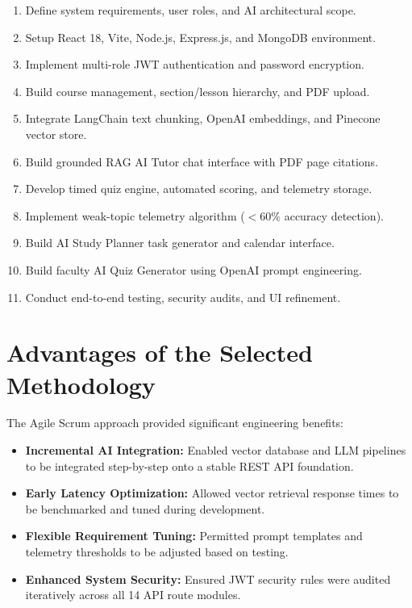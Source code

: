 \begin{enumerate}
    \item Define system requirements, user roles, and AI architectural scope.
    \item Setup React 18, Vite, Node.js, Express.js, and MongoDB environment.
    \item Implement multi-role JWT authentication and password encryption.
    \item Build course management, section/lesson hierarchy, and PDF upload.
    \item Integrate LangChain text chunking, OpenAI embeddings, and Pinecone vector store.
    \item Build grounded RAG AI Tutor chat interface with PDF page citations.
    \item Develop timed quiz engine, automated scoring, and telemetry storage.
    \item Implement weak-topic telemetry algorithm ($<60\%$ accuracy detection).
    \item Build AI Study Planner task generator and calendar interface.
    \item Build faculty AI Quiz Generator using OpenAI prompt engineering.
    \item Conduct end-to-end testing, security audits, and UI refinement.
\end{enumerate}

\section{Advantages of the Selected Methodology}

The Agile Scrum approach provided significant engineering benefits:

\begin{itemize}
    \item \textbf{Incremental AI Integration:} Enabled vector database and LLM pipelines to be integrated step-by-step onto a stable REST API foundation.
    
    \item \textbf{Early Latency Optimization:} Allowed vector retrieval response times to be benchmarked and tuned during development.
    
    \item \textbf{Flexible Requirement Tuning:} Permitted prompt templates and telemetry thresholds to be adjusted based on testing.
    
    \item \textbf{Enhanced System Security:} Ensured JWT security rules were audited iteratively across all 14 API route modules.
\end{itemize}

